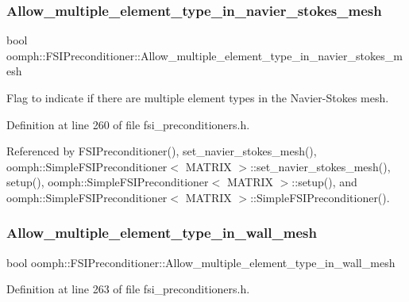 \subsubsection{\texorpdfstring{Allow\+\_\+multiple\+\_\+element\+\_\+type\+\_\+in\+\_\+navier\+\_\+stokes\+\_\+mesh}{Allow\_multiple\_element\_type\_in\_navier\_stokes\_mesh}}
{\footnotesize\ttfamily bool oomph\+::\+F\+S\+I\+Preconditioner\+::\+Allow\+\_\+multiple\+\_\+element\+\_\+type\+\_\+in\+\_\+navier\+\_\+stokes\+\_\+mesh\hspace{0.3cm}{\ttfamily [private]}}

Flag to indicate if there are multiple element types in the Navier-\/\+Stokes mesh. 

Definition at line 260 of file fsi\+\_\+preconditioners.\+h.



Referenced by F\+S\+I\+Preconditioner(), set\+\_\+navier\+\_\+stokes\+\_\+mesh(), oomph\+::\+Simple\+F\+S\+I\+Preconditioner$<$ M\+A\+T\+R\+I\+X $>$\+::set\+\_\+navier\+\_\+stokes\+\_\+mesh(), setup(), oomph\+::\+Simple\+F\+S\+I\+Preconditioner$<$ M\+A\+T\+R\+I\+X $>$\+::setup(), and oomph\+::\+Simple\+F\+S\+I\+Preconditioner$<$ M\+A\+T\+R\+I\+X $>$\+::\+Simple\+F\+S\+I\+Preconditioner().

\mbox{\label{classoomph_1_1FSIPreconditioner_a87e5a1cb279243414b1b0c2a5834efb5}} 
\subsubsection{\texorpdfstring{Allow\+\_\+multiple\+\_\+element\+\_\+type\+\_\+in\+\_\+wall\+\_\+mesh}{Allow\_multiple\_element\_type\_in\_wall\_mesh}}
{\footnotesize\ttfamily bool oomph\+::\+F\+S\+I\+Preconditioner\+::\+Allow\+\_\+multiple\+\_\+element\+\_\+type\+\_\+in\+\_\+wall\+\_\+mesh\hspace{0.3cm}{\ttfamily [private]}}



Definition at line 263 of file fsi\+\_\+preconditioners.\+h.



